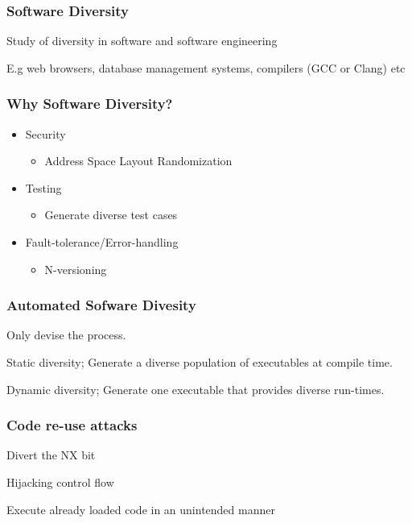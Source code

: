 \begin{frame}
	\frametitle{Software Diversity}

	Study of diversity in software and software engineering

	\vspace{0.5cm}

	E.g web browsers, database management systems, compilers (GCC or Clang) etc

\end{frame}

\begin{frame}
	\frametitle{Why Software Diversity?}

	\begin{itemize}
		\item Security
			\begin{itemize}
				\item	Address Space Layout Randomization
			\end{itemize}
		\item Testing
			\begin{itemize}
				\item Generate diverse test cases
			\end{itemize}
		\item	Fault-tolerance/Error-handling
			\begin{itemize}
				\item N-versioning\cite{n-version}
			\end{itemize}
	\end{itemize}

\end{frame}

\begin{frame}
	\frametitle{Automated Sofware Divesity}

	Only devise the process.

	\vspace{0.5cm}

	Static diversity; Generate a diverse population of executables at compile time.

	\vspace{0.5cm}

	Dynamic diversity; Generate one executable that provides diverse run-times.

\end{frame}

\begin{frame}
	\frametitle{Code re-use attacks}

	Divert the NX bit

	\vspace{0.5cm}

	Hijacking control flow

	\vspace{0.5cm}

	Execute already loaded code in an unintended manner

\end{frame}

